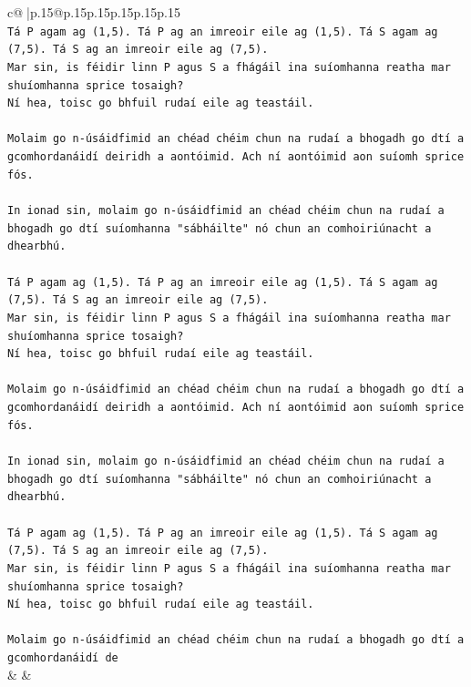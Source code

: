\documentclass{article}
\begin{document}
{\begin{supertabular}{c@{$\;$}|p{.15\linewidth}@{}p{.15\linewidth}p{.15\linewidth}p{.15\linewidth}p{.15\linewidth}p{.15\linewidth}}
{{{\\ 
\texttt{Tá P agam ag (1,5). Tá P ag an imreoir eile ag (1,5). Tá S agam ag (7,5). Tá S ag an imreoir eile ag (7,5).} \\
\texttt{Mar sin, is féidir linn P agus S a fhágáil ina suíomhanna reatha mar shuíomhanna sprice tosaigh?} \\
\texttt{Ní hea, toisc go bhfuil rudaí eile ag teastáil.} \\
\\ 
\texttt{Molaim go n{-}úsáidfimid an chéad chéim chun na rudaí a bhogadh go dtí a gcomhordanáidí deiridh a aontóimid. Ach ní aontóimid aon suíomh sprice fós.} \\
\\ 
\texttt{In ionad sin, molaim go n{-}úsáidfimid an chéad chéim chun na rudaí a bhogadh go dtí suíomhanna "sábháilte" nó chun an comhoiriúnacht a dhearbhú.} \\
\\ 
\texttt{Tá P agam ag (1,5). Tá P ag an imreoir eile ag (1,5). Tá S agam ag (7,5). Tá S ag an imreoir eile ag (7,5).} \\
\texttt{Mar sin, is féidir linn P agus S a fhágáil ina suíomhanna reatha mar shuíomhanna sprice tosaigh?} \\
\texttt{Ní hea, toisc go bhfuil rudaí eile ag teastáil.} \\
\\ 
\texttt{Molaim go n{-}úsáidfimid an chéad chéim chun na rudaí a bhogadh go dtí a gcomhordanáidí deiridh a aontóimid. Ach ní aontóimid aon suíomh sprice fós.} \\
\\ 
\texttt{In ionad sin, molaim go n{-}úsáidfimid an chéad chéim chun na rudaí a bhogadh go dtí suíomhanna "sábháilte" nó chun an comhoiriúnacht a dhearbhú.} \\
\\ 
\texttt{Tá P agam ag (1,5). Tá P ag an imreoir eile ag (1,5). Tá S agam ag (7,5). Tá S ag an imreoir eile ag (7,5).} \\
\texttt{Mar sin, is féidir linn P agus S a fhágáil ina suíomhanna reatha mar shuíomhanna sprice tosaigh?} \\
\texttt{Ní hea, toisc go bhfuil rudaí eile ag teastáil.} \\
\\ 
\texttt{Molaim go n{-}úsáidfimid an chéad chéim chun na rudaí a bhogadh go dtí a gcomhordanáidí de} \\
            }
        }
    }
    & & \\ \\


\end{supertabular}}
\end{document}
